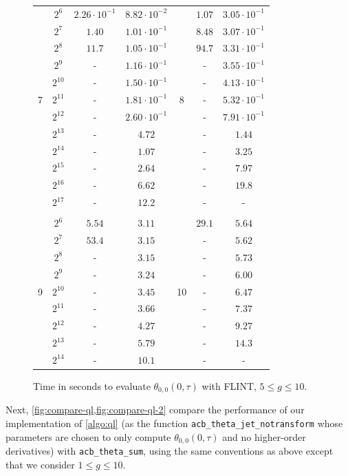 \documentclass[12pt,oneside]{amsart}
\numberwithin{equation}{section}
\theoremstyle{definition}
\begin{document}
\begin{figure}
{\begin{tabular}{|c|c|cc||c|cc|}
        & $2^6$ & $2.26\cdot 10^{-1}$ & $8.82\cdot 10^{-2}$ & & $1.07$ & $3.05\cdot 10^{-1}$ \\
        & $2^7$ & $1.40$ & $1.01\cdot 10^{-1}$ & & $8.48$ & $3.07\cdot 10^{-1}$ \\
        & $2^8$ & $11.7$ & $1.05\cdot 10^{-1}$ & & $94.7$ & $3.31\cdot 10^{-1}$ \\
        & $2^9$ & -& $1.16\cdot 10^{-1}$ & & -& $3.55\cdot 10^{-1}$ \\
        & $2^{10}$ & -& $1.50\cdot 10^{-1}$ & & -& $4.13\cdot 10^{-1}$ \\
        7 & $2^{11}$ & -& $1.81\cdot 10^{-1}$ & 8 & -& $5.32\cdot 10^{-1}$ \\
        & $2^{12}$ & -& $2.60\cdot 10^{-1}$ & & -& $7.91\cdot 10^{-1}$ \\
        & $2^{13}$ & -& $4.72$ & & -& $1.44$ \\
        & $2^{14}$ & -& $1.07$ & & -& $3.25$ \\
        & $2^{15}$ & -& $2.64$ & & -& $7.97$ \\
        & $2^{16}$ & -& $6.62$ & & -& $19.8$ \\
        & $2^{17}$ & -& $12.2$ & & -& - \\ \hline & & & & & & \\[-1em]

        & $2^6$ & $5.54$ & $3.11$ && $29.1$ & $5.64$ \\
        & $2^7$ & $53.4$ & $3.15$ && - & $5.62$ \\
        & $2^8$ & - & $3.15$ & & - & $5.73$ \\
        & $2^9$ & - & $3.24$ && - & $6.00$ \\
       9 & $2^{10}$ & - & $3.45$ & 10 & - & $6.47$\\
        & $2^{11}$ & - & $3.66$ && - & $7.37$ \\
        & $2^{12}$ & - & $4.27$ && - & $9.27$ \\
        & $2^{13}$ & - & $5.79$ && - & $14.3$ \\
        & $2^{14}$ & - & $10.1$ && - & - \\ \hline
  \end{tabular}}
  \caption{Time in seconds to evaluate $\theta_{0,0}(0,\tau)$ with FLINT, $5\leq g\leq 10$.}
  \label{fig:compare-ql-2}
\end{figure}



Next, \cref{fig:compare-ql,fig:compare-ql-2} compare the performance of our
implementation of \cref{algo:ql} (as the function
\texttt{acb\_theta\_jet\_notransform} whose parameters are chosen to only
compute $\theta_{0,0}(0,\tau)$ and no higher-order derivatives) with
\texttt{acb\_theta\_sum}, using the same conventions as above except that we
consider $1\leq g\leq 10$.
\end{document}
